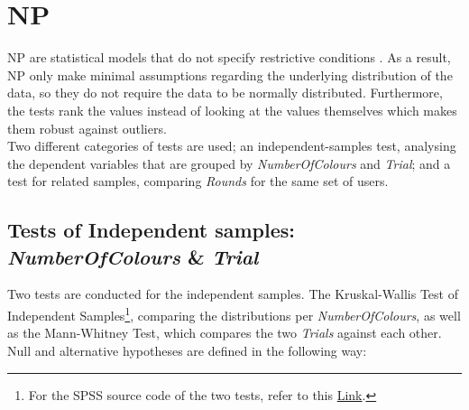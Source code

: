 %
%
\section{\acf{NP}}
\label{ch:Evaluation:sec:Non-parametrictest}

\acl{NP} are statistical models that do not specify restrictive conditions \citep{Siegel1957}. As a result, \ac{NP} only make minimal assumptions regarding the underlying distribution of the data, so they do not require the data to be normally distributed. Furthermore, the tests rank the values instead of looking at the values themselves which makes them robust against outliers.\\
Two different categories of tests are used; an independent-samples test, analysing the dependent variables that are grouped by \textit{NumberOfColours} and \textit{Trial}; and a test for related samples, comparing \textit{Rounds} for the same set of users. 

\subsection{Tests of Independent samples: \textit{NumberOfColours} \& \textit{Trial}}
Two tests are conducted for the independent samples. The Kruskal-Wallis Test of Independent Samples\footnote{For the SPSS source code of the two tests, refer to this \href{http://publib.boulder.ibm.com/infocenter/spssstat/v20r0m0/topic/com.ibm.spss.statistics.help/alg_nonparametric_independent_wald-wolfowitz.htm}{Link}.}, comparing the distributions per \textit{NumberOfColours}, as well as the Mann-Whitney Test, which compares the two \textit{Trials} against each other.\\
Null and alternative hypotheses are defined in the following way: 


